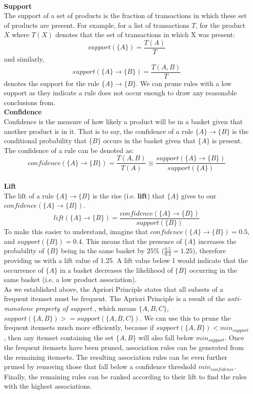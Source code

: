 \documentclass[a4paper,11pt]{article}
\newcommand{\setA}{\{A\}}
\newcommand{\setB}{\{B\}}
\newcommand{\abrule}{\setA\rightarrow\setB}
\begin{document}
\\\textbf{Support}\\
The support of a set of products is the fraction of transactions in which these set of products are present. For example,  for a list of transactions $T$, for the product $X$ where $T(X)$ denotes that the set of transactions in which X was present:
\[
\textit{support}(\{A\}) = \frac{T(A)}{T}
\]
and similarly, 
\[
\textit{support}(\abrule) = \frac{T(A,B)}{T}
\]
denotes the support for the rule $\abrule$. We can prune rules with a low support as they indicate a rule does not occur enough to draw any reasonable conclusions from.
\\\textbf{Confidence}\\
Confidence is the measure of how likely a product will be in a basket given that another product is in it. That is to say,  the confidence of a rule $\abrule$ is the conditional probability that $\setB$ occurs in the basket given that $\setA$ is present. The confidence of a rule can be denoted as:
\[
\textit{confidence}(\abrule) = \frac{T(A, B)}{T(A)} \equiv \frac{\textit{support}(\abrule)}{\textit{support}(\setA)}
\]
\\\textbf{Lift}\\
The lift of a rule $\abrule$ is the rise (i.e. \textbf{lift}) that $\setA$ gives to our $\textit{confidence}(\abrule)$.
\[
\textit{lift}(\abrule) = \frac{confidence(\abrule)}{support(\setB)}
\]
To make this easier to understand, imagine that $\textit{confidence}(\abrule)=0.5$, and $\textit{support}(\setB)=0.4.$ This means that the presence of $\setA$ increases the probability of $\setB$ being in the same basket by $25\%$ ($\frac{0.5}{0.4}=1.25$), therefore providing us with a lift value of 1.25.  A lift value below 1 would indicate that the occurrence of $\setA$ in a basket decreases the likelihood of $\setB$ occurring in the same basket (i.e. a low product association).
\\
As we established above,  the Apriori Principle states that all subsets of a frequent itemset must be frequent.  The Apriori Principle is a result of the \textit{anti-monotone property of support} \cite{anti_monotone}, which means $\{A,B,C\}$, $\textit{support}(\{A,B\}) >= \textit{support}(\{A,B,C\})$.  We can use this to prune the frequent itemsets much more efficiently, because if $support(\{A,B\}) < \textit{min}_{\textit{support}}$, then any itemset containing the set $\{A,B\}$ will also fall below $\textit{min}_{\textit{support}}$. Once the frequent itemsets have been pruned,  association rules can be generated from the remaining itemsets.  The resulting association rules can be even further pruned by removing those that fall below a confidence threshold $\textit{min}_{\textit{confidence}}$.  Finally, the remaining rules can be ranked according to their  lift to find the rules with the highest associations.  
\end{document}
